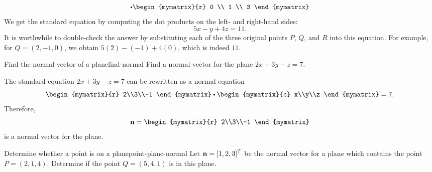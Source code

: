 \begin{solution}
\begin{equation*}
    \dotprod
    \begin{mymatrix}{r} 0 \\ 1 \\ 3 \end{mymatrix}
  \end{equation*}
  We get the standard equation by computing the dot products on the
  left- and right-hand sides:
  \begin{equation*}
    5x - y + 4z = 11.
  \end{equation*}
  It is worthwhile to double-check the answer by substituting each of
  the three original points $P$, $Q$, and $R$ into this equation.
  For example, for $Q=(2,-1,0)$, we obtain $5(2)-(-1)+4(0)$, which is
  indeed $11$.
\end{solution}

\begin{example}{Find the normal vector of a plane}{find-normal}
  Find a normal vector for the plane $2x+3y-z=7$.
\end{example}

\begin{solution}
  The standard equation $2x+3y-z=7$ can be rewritten as a normal
  equation
  \begin{equation*}
    \begin{mymatrix}{r} 2\\3\\-1 \end{mymatrix}
    \dotprod
    \begin{mymatrix}{c} x\\y\\z \end{mymatrix}
    = 7.
  \end{equation*}
  Therefore,
  \begin{equation*}
    \vect{n} = \begin{mymatrix}{r} 2\\3\\-1 \end{mymatrix}
  \end{equation*}
  is a normal vector for the plane.
\end{solution}

\begin{example}{Determine whether a point is on a plane}{point-plane-normal}
  Let $\vect{n} = \mat{1,2,3}^T$ be the normal vector for a plane
  which contains the point $P = (2,1,4)$. Determine if the point
  $Q = (5,4,1)$ is in this plane.
\end{example}

